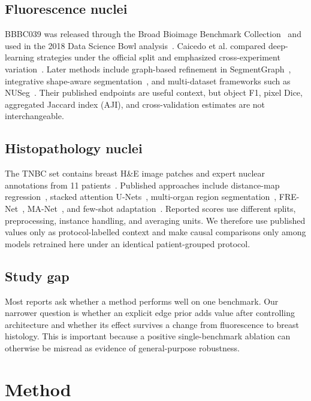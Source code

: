 \documentclass{article}
\begin{document}
\subsection{Fluorescence nuclei}
BBBC039 was released through the Broad Bioimage Benchmark Collection~\cite{ljosa2012annotated} and used in the 2018 Data Science Bowl analysis~\cite{caicedo2019nucleus}. Caicedo et al. compared deep-learning strategies under the official split and emphasized cross-experiment variation~\cite{caicedo2019evaluation}. Later methods include graph-based refinement in SegmentGraph~\cite{yi2022segmentgraph}, integrative shape-aware segmentation~\cite{wang2022aswnet}, and multi-dataset frameworks such as NUSeg~\cite{wickramasinghe2024nuseg}. Their published endpoints are useful context, but object F1, pixel Dice, aggregated Jaccard index (AJI), and cross-validation estimates are not interchangeable.

\subsection{Histopathology nuclei}
The TNBC set contains breast H\&E image patches and expert nuclear annotations from 11 patients~\cite{naylor2019segmentation}. Published approaches include distance-map regression~\cite{naylor2019segmentation}, stacked attention U-Nets~\cite{kang2020twostage}, multi-organ region segmentation~\cite{mahmood2021accurate}, FRE-Net~\cite{huang2023frenet}, MA-Net~\cite{alotaibi2024manet}, and few-shot adaptation~\cite{he2023celltranspose}. Reported scores use different splits, preprocessing, instance handling, and averaging units. We therefore use published values only as protocol-labelled context and make causal comparisons only among models retrained here under an identical patient-grouped protocol.

\subsection{Study gap}
Most reports ask whether a method performs well on one benchmark. Our narrower question is whether an explicit edge prior adds value after controlling architecture and whether its effect survives a change from fluorescence to breast histology. This is important because a positive single-benchmark ablation can otherwise be misread as evidence of general-purpose robustness.

\section{Method}
\end{document}
